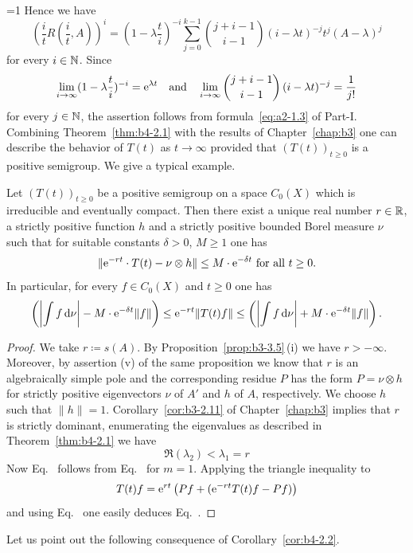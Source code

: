 %
=1 
Hence we have
%
\[
	(\frac{i}{t}R(\frac{i}{t},A))^i = (1-\lambda\frac{t}{i})^{-i}\sum_{j=0}^{k-1}\binom{j+i-1}{i-1}(i-\lambda t)^{-j}t^j(A-\lambda)^j 
\]
%
for every $i \in \mathbb{N}$.
Since 
%
\[
	 \lim_{i\to\infty}(1-\lambda\frac{t}{i})^{-i} = \mathrm{e}^{\lambda t}
	 \quad \text{and} \quad \lim_{i\to\infty}\binom{j+i-1}{i-1}\,(i-\lambda t)^{-j} = \frac{1}{j!}
\]
%
for every $j \in \mathbb{N}$, the assertion follows from 
formula~\eqref{eq:a2-1.3} of Part-I.
\fi
Combining Theorem~\ref{thm:b4-2.1} with the results of Chapter~\ref{chap:b3} one can describe
the behavior of\/ $T(t)$ as $t \to \infty$ provided that $(T(t))_{t \geq 0}$ is a positive semigroup.
We give a typical example.
\begin{corollary}\label{cor:b4-2.2}
	Let $(T(t))_{t \geq 0}$ be a positive semigroup on a space
	$C_{0}(X)$ which is irreducible and eventually compact.
	Then there exist a
	unique real number $r \in \mathbb{R}$, a strictly positive function $h$ and a
	strictly positive bounded Borel measure $\nu$ such that for suitable
	constants $\delta > 0$, $M \geq 1$ one has
	\begin{equation}\label{eq:b4-2.2}
		\|\eu^{-rt}\cdot T(t) - \nu\otimes h\| \leq M\cdot \eu^{-\delta t} \text{ for all } t \geq 0 .
	\end{equation}
	In particular, for every $f \in C_{0}(X)$ and $t \geq 0$ one has
	\begin{equation}\label{eq:b4-2.3} 
		\left(\left|\int f \diff{\nu}\right| - M\cdot \eu^{-\delta t}\|f\|\right) \leq \eu^{-rt}\|T(t)f\| \leq \left(\left|\int f \diff{\nu}\right| + M\cdot \eu^{-\delta t}\|f\|\right).
	\end{equation}
\end{corollary}
\begin{proof}
	We take $r  \coloneq  s(A)$.
	By Proposition~\ref{prop:b3-3.5}\,(i) we have $r > -\infty$.
	Moreover, by assertion (v) of the same proposition we know that $r$ is
	an algebraically simple pole and the corresponding residue $P$ has the
	form $P = \nu \otimes h$ for strictly positive eigenvectors $\nu$ of\/ $A'$
	and $h$ of\/ $A$, respectively.
    We choose $h$ such that 
	$\|h\| = 1$.
	Corollary~\ref{cor:b3-2.11} of Chapter~\ref{chap:b3} implies that $r$ is strictly
	dominant, \ie enumerating the eigenvalues as described in Theorem~\ref{thm:b4-2.1} we
	have 
\[
	\Re(\lambda_2) < \lambda_1 = r 
\]
Now Eq.~ follows from Eq.~ for $m = 1$.
Applying the triangle inequality to %
\[
	 T(t)f = \mathrm{e}^{rt}\left(Pf + (\mathrm{e}^{-rt}T(t)f-Pf)\right) 
\]
%
and using Eq.~ one easily deduces Eq.~.
\end{proof}
 Let us point out the following consequence of Corollary~\ref{cor:b4-2.2}.

